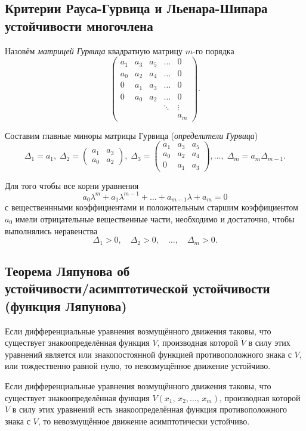 \documentclass[a4paper]{article}
\begin{document}
\subsection{Критерии Рауса-Гурвица и Льенара-Шипара устойчивости многочлена}
\begin{dfn}
	 Назовём \emph{матрицей Гурвица} квадратную  матрицу $m$-го порядка
	 \[
		 \begin{pmatrix} a_1 & a_3 & a_5 & \ldots & 0\\
		 a_0 & a_2 & a_4 & \ldots & 0 \\
	 0 & a_1 & a_3 & \ldots & 0\\
 0 & a_0 & a_2 & \ldots & 0 \\
  & & & \ddots & \vdots\\
  & & & & a_m
 \end{pmatrix} 
	  .\] 
\end{dfn}
Составим главные миноры  матрицы Гурвица (\emph{определители Гурвица})
\[
	\Delta_1=a_1, \; \Delta_2 = \begin{pmatrix} a_1 & a_3 \\ a_0 & a_2 \end{pmatrix},
	\; \Delta_3= \begin{pmatrix} a_1 & a_3 & a_5 \\ a_0 & a_2 & a_4 \\
	0 & a_1 & a_3\end{pmatrix} ,\ldots,\; \Delta_m =a_m \Delta_{m-1}
.\] 
\begin{thm}
	Для того чтобы все корни уравнения
	\[
	a_0 \lambda^m+a_1 \lambda^{m-1}+\ldots+a_{m-1}\lambda+a_m=0
	\]
	с вещественнными коэффициентами и положительным старшим  коэффициентом
	$a_0$ имели отрицательные вещественные   части, необходимо и достаточно,
	чтобы выполнялись неравенства
	\[
	\Delta_1>0,\quad\Delta_2>0,\quad \ldots, \quad \Delta_m >0
	.\] 
\end{thm}
\subsection{Теорема Ляпунова об\\
	устойчивости/асимптотической устойчивости\\
(функция Ляпунова)}
\begin{thm}
	Если дифференциальные уравнения возмущённого движения таковы, что
	существует знакоопределённая функция $V$, производная которой $\dot{V}$ 
	в силу этих уравнений является  или  знакопостоянной функцией
	противоположного знака с $V$, или тождественно равной нулю, то
	невозмущённое движение устойчиво.
\end{thm}
\begin{thm}
	Если дифференциальные уравнения возмущённого движения таковы, что
	существует знакоопределённая функция $V(x_1,\,x_2,\ldots,\,x_m)$,
	производная которой $\dot{V}$  в силу этих уравнений  есть
	знакоопределённая функция противоположного знака с $V$, то
	невозмущённое движение асимптотически устойчиво.
\end{thm}
\end{document}
